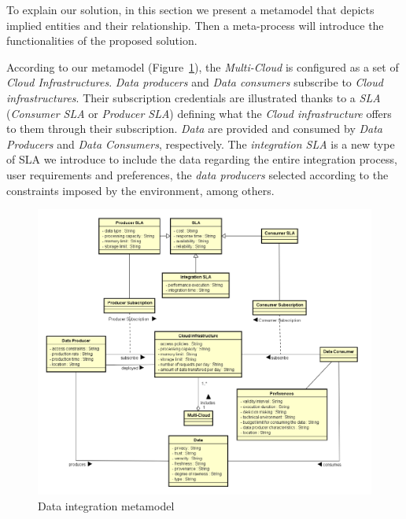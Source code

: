 To explain our solution, in this section we present a metamodel that depicts implied entities and their relationship. 
Then a meta-process will introduce the functionalities of the proposed solution.

According to our metamodel (Figure~\ref{fig:scenario}), the \textsl{Multi-Cloud} is configured as a set of \textsl{Cloud Infrastructures}. \textsl{Data producers} and \textsl{Data consumers} subscribe to \textsl{Cloud infrastructures}. 
Their subscription credentials are illustrated thanks to a \textsl{SLA} (\textsl{Consumer SLA} or \textsl{Producer SLA}) defining what the \textsl{Cloud infrastructure} offers to them through their subscription. 
\textsl{Data} are provided and consumed by \textsl{Data Producers} and \textsl{Data Consumers}, respectively. The \textsl{integration SLA} is a new type of SLA we introduce  to include the data regarding the entire integration process, user requirements and preferences, the \textsl{data producers} selected according to the constraints imposed by the environment, among others.

\begin{figure}[th!]
\center
\includegraphics[scale=0.43]{metamodel.pdf}
\caption{Data integration metamodel}\label{fig:scenario}
\end{figure}

